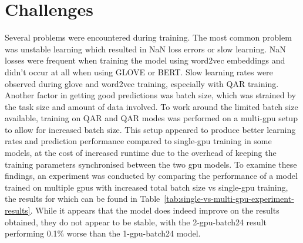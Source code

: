 \section{Challenges}
\label{sec:experiment-challenges}

Several problems were encountered during training.
The most common problem was unstable learning which resulted in NaN loss errors or slow learning.
NaN losses were frequent when training the model using word2vec embeddings and didn't occur at all when using GLOVE or BERT.
Slow learning rates were observed during glove and word2vec training, especially with Q\rightarrow{}AR training.
Another factor in getting good predictions was batch size, which was strained by the task size and amount of data involved.
To work around the limited batch size available, training on QA\rightarrow{}R and Q\rightarrow{}AR modes was performed on a multi-\gls{gpu} setup to allow for increased batch size.
This setup appeared to produce better learning rates and prediction performance compared to single-\gls{gpu} training in some models, at the cost of increased runtime due to the overhead of keeping the training parameters synchronised between the two \gls{gpu} models.
To examine these findings, an experiment was conducted by comparing the performance of a model trained on multiple \glspl{gpu} with increased total batch size vs single-\gls{gpu} training, the results for which can be found in Table~\ref{tab:single-vs-multi-gpu-experiment-results}.
While it appears that the model does indeed improve on the results obtained, they do not appear to be stable, with the 2-\gls{gpu}-batch24 result performing 0.1\% worse than the 1-\gls{gpu}-batch24 model.

